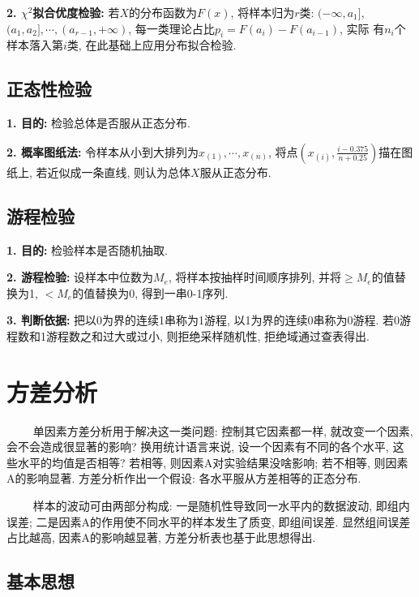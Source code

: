 \textbf{2. $\chi^2$拟合优度检验: }若$X$的分布函数为$F(x)$, 将样本归为$r$类: $(-\infty,a_1],$ $(a_1,a_2], \cdots,(a_{r-1},+\infty)$, 每一类理论占比$p_i=F(a_i)-F(a_{i-1})$, 实际
有$n_i$个样本落入第$i$类, 在此基础上应用分布拟合检验.

\subsection{正态性检验}

\textbf{1. 目的: }检验总体是否服从正态分布.

\textbf{2. 概率图纸法: }令样本从小到大排列为$x_{(1)},\cdots,x_{(n)}$, 将点$\left(x_{(i)},\frac{i-0.375}{n+0.25}\right)$描在图纸上, 若近似成一条直线, 则认为总体$X$服从正态分布.

\subsection{游程检验}

\textbf{1. 目的: }检验样本是否随机抽取.

\textbf{2. 游程检验: }设样本中位数为$M_e$, 将样本按抽样时间顺序排列, 并将$\geq M_e$的值替换为1, $<M_e$的值替换为0, 得到一串0-1序列.

\textbf{3. 判断依据: }把以0为界的连续1串称为1游程, 以1为界的连续0串称为0游程. 若0游程数和1游程数之和过大或过小, 则拒绝采样随机性, 拒绝域通过查表得出.

\section{方差分析}
\begin{tcolorbox}[colback=red!5,colframe=red!75!black]
    ~~~~ 单因素方差分析用于解决这一类问题: 控制其它因素都一样, 就改变一个因素, 会不会造成很显著的影响? 换用统计语言来说, 设一个因素有不同的各个水平, 这些水平的均值是否相等? 若相等, 则因素A对实验结果没啥影响; 若不相等, 
    则因素A的影响显著. 方差分析作出一个假设: 各水平服从方差相等的正态分布.

    ~~~~ 样本的波动可由两部分构成: 一是随机性导致同一水平内的数据波动, 即组内误差; 二是因素A的作用使不同水平的样本发生了质变, 即组间误差. 显然组间误差占比越高, 因素A的影响越显著, 方差分析表也基于此思想得出.
\end{tcolorbox}

\subsection{基本思想}

